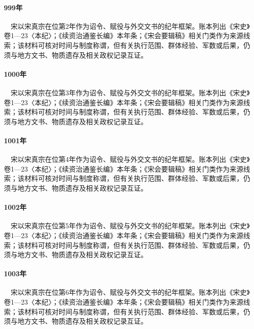 \paragraph{999年}　宋以宋真宗在位第2年作为诏令、赋役与外交文书的纪年框架。账本列出《宋史》卷1—23〈本纪〉；《续资治通鉴长编》本年条；《宋会要辑稿》相关门类作为来源线索；该材料可核对时间与制度称谓，但有关执行范围、群体经验、军数或后果，仍须与地方文书、物质遗存及相关政权记录互证。

\paragraph{1000年}　宋以宋真宗在位第3年作为诏令、赋役与外交文书的纪年框架。账本列出《宋史》卷1—23〈本纪〉；《续资治通鉴长编》本年条；《宋会要辑稿》相关门类作为来源线索；该材料可核对时间与制度称谓，但有关执行范围、群体经验、军数或后果，仍须与地方文书、物质遗存及相关政权记录互证。

\paragraph{1001年}　宋以宋真宗在位第4年作为诏令、赋役与外交文书的纪年框架。账本列出《宋史》卷1—23〈本纪〉；《续资治通鉴长编》本年条；《宋会要辑稿》相关门类作为来源线索；该材料可核对时间与制度称谓，但有关执行范围、群体经验、军数或后果，仍须与地方文书、物质遗存及相关政权记录互证。

\paragraph{1002年}　宋以宋真宗在位第5年作为诏令、赋役与外交文书的纪年框架。账本列出《宋史》卷1—23〈本纪〉；《续资治通鉴长编》本年条；《宋会要辑稿》相关门类作为来源线索；该材料可核对时间与制度称谓，但有关执行范围、群体经验、军数或后果，仍须与地方文书、物质遗存及相关政权记录互证。

\paragraph{1003年}　宋以宋真宗在位第6年作为诏令、赋役与外交文书的纪年框架。账本列出《宋史》卷1—23〈本纪〉；《续资治通鉴长编》本年条；《宋会要辑稿》相关门类作为来源线索；该材料可核对时间与制度称谓，但有关执行范围、群体经验、军数或后果，仍须与地方文书、物质遗存及相关政权记录互证。

